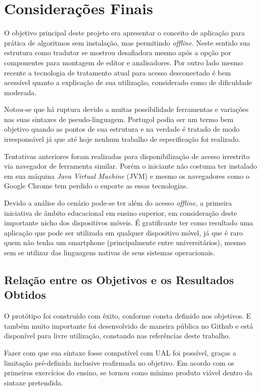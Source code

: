 
\chapter{Considerações Finais}

O objetivo principal deste projeto era apresentar o conceito de aplicação para prática de algoritmos sem instalação, mas permitindo \textit{offline}. Neste sentido sua estrutura como tradutor se mostrou desafiadora mesmo após a opção por componentes para montagem de editor e analisadores. Por outro lado mesmo recente a tecnologia de tratamento atual para acesso desconectado é bem acessível quanto a explicação de sua utilização, considerado como de dificuldade moderada.

Notou-se que há ruptura devido a muitas possibilidade ferramentas e variações nas suas sintaxes de pseudo-linguagem. Portugol podia ser um termo bem objetivo quando as pontos de sua estrutura e na verdade é tratado de modo irresponsável já que até hoje nenhum trabalho de especificação foi realizado.

Tentativas anteriores foram realizadas para disponibilização de acesso irrestrito via navegador de ferramenta similar. Porém o iniciante não costuma ter instalado em sua máquina \textit{Java Virtual Machine} (JVM) e mesmo os navegadores como o Google Chrome tem perdido o suporte as essas tecnologias.

Devido a análise do cenário pode-se ter além do acesso \textit{offline}, a primeira iniciativa de âmbito educacional em ensino superior, em consideração deste importante nicho dos dispositivos móveis. É gratificante ter como resultado uma aplicação que pode ser utilizada em qualquer dispositivo móvel, já que é raro quem não tenha um smartphone (principalmente entre universitários), mesmo sem se utilizar das linguagens nativas de seus sistemas operacionais.

\section{Relação entre os Objetivos e os Resultados Obtidos}

O protótipo foi construído com êxito, conforme consta definido nos objetivos. E também muito importante foi desenvolvido de maneira pública no Github e está disponível para livre utilização, constando nas referências deste trabalho.

Fazer com que sua sintaxe fosse compatível com UAL foi possível, graças a limitação pré-definida inclusive reafirmada no objetivo. Em acordo com os primeiros exercícios do ensino, se tornou como mínimo produto viável dentro da sintaxe pretendida.

